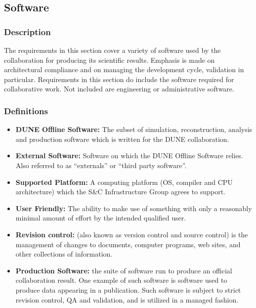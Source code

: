 \subsection{Software}
\label{sec:req-software}
\subsubsection{Description}
The requirements in this section cover a variety of software used by the collaboration for producing its scientific results. Emphasis is made on architectural compliance and on managing the development cycle, validation in particular. Requirements in this section do include the software required for collaborative work. Not included are engineering or administrative software.


\subsubsection{Definitions}

\begin{itemize}
\item \textbf{DUNE Offline Software:} The subset of simulation, reconstruction, analysis and production software which is written for the DUNE collaboration.

\item \textbf{External Software:}  Software on which the DUNE Offline Software relies.  Also referred to as ``externals'' or ``third party software''.

\item \textbf{Supported Platform:} A computing platform (OS, compiler and CPU architecture) which the S\&C Infrastructure Group agrees to support.

\item \textbf{User Friendly:} The ability to make use of something with only a reasonably minimal amount of effort by the intended qualified user.

\item \textbf{Revision control:} (also known as version control and source control) is the management of changes to documents, computer programs, web sites, and other collections of information.

\item \textbf{Production Software:} the suite of software run to produce an official collaboration result. One example of such software is software used to produce data appearing in a publication. Such software is subject to strict revision control, QA and validation, and is utilized in a managed fashion.

\end{itemize}

